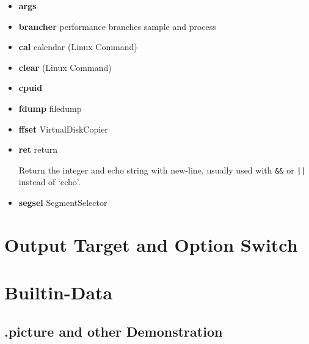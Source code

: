 \begin{itemize}

\item \textbf{args}



\item \textbf{brancher} performance branches sample and process



\item \textbf{cal} calendar (Linux Command)



\item \textbf{clear} (Linux Command)



\item \textbf{cpuid}



\item \textbf{fdump} filedump



\item \textbf{ffset} VirtualDiskCopier



\item \textbf{ret} return

Return the integer and echo string with new-line, usually used with \verb|&&| or \verb!||! instead of `echo'.



\item \textbf{segsel} SegmentSelector



\end{itemize}



\section{Output Target and Option Switch}





\section{Builtin-Data}



\subsection{.picture and other Demonstration}




